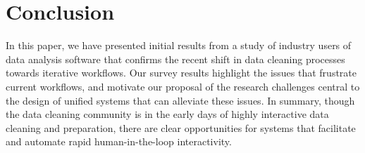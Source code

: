 \section{Conclusion}
In this paper, we have presented initial results from a study of industry users of data analysis software that confirms the recent shift in data cleaning processes towards iterative workflows.
Our survey results highlight the issues that frustrate current workflows, and motivate our proposal of the research challenges central to the design of unified systems that can alleviate these issues.
In summary, though the data cleaning community is in the early days of highly interactive data cleaning and preparation, there are clear opportunities for systems that facilitate and automate rapid human-in-the-loop interactivity.

